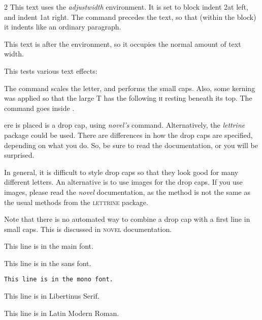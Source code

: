 \documentclass[test,shademargins,draft]{novel} %
\begin{document}
\begin{adjustwidth}{2\normalparindent}{\normalparindent}
\forceindent This text uses the \textit{adjustwidth} environment. It is set to block indent 2\string\normalparindent\space at left, and indent 1\string\normalparindent\space at right. The \string\forceindent\space command precedes the text, so that (within the block) it indents like an ordinary paragraph.\par
\end{adjustwidth}

This text is after the environment, so it occupies the normal amount of text width.

\clearpage



This tests various text effects:

\null


The \string\charscale\space command scales the letter, and \string\FirstLine\space performs the small caps. Also, some kerning was applied so that the large T has the following \textsc{h} resting beneath its top. The \string\noindent\space command goes inside \string\FirstLine.

\null\null

ere is placed is a drop cap, using \textit{novel's} \string\dropcap\space command. Alternatively, the \textit{lettrine} package could be used. There are differences in how the drop caps are specified, depending on what you do. So, be sure to read the documentation, or you will be surprised.\par
In general, it is difficult to style drop caps so that they look good for many different letters. An alternative is to use images for the drop caps. If you use images, please read the \textit{novel} documentation, as the method is not the same as the usual methods from the \textsc{lettrine} package.\par
Note that there is no automated way to combine a drop cap with a first line in small caps. This is discussed in \textsc{novel} documentation.

\null
This line is in the main font.\par
\textsf{This line is in the sans font.}\par
\texttt{This line is in the mono font.}\par
{\mustbelibertinus This line is in Libertinus Serif.}\par %
{\mustbelmodern This line is in Latin Modern Roman.}\par %
\end{document}
